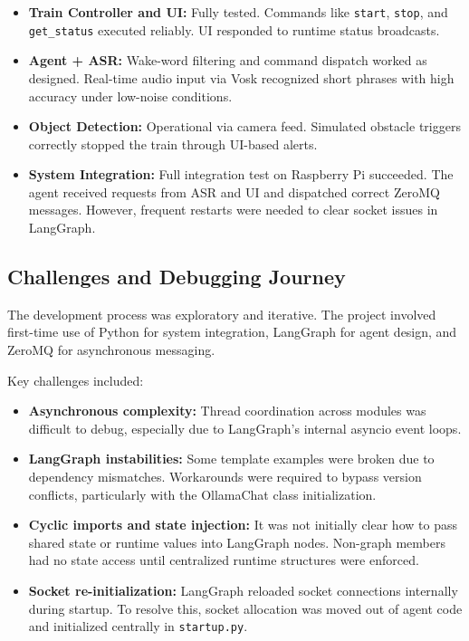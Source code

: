 \begin{itemize}
  \item \textbf{Train Controller and UI:} Fully tested. Commands like \texttt{start}, \texttt{stop}, and \texttt{get\_status} executed reliably. UI responded to runtime status broadcasts.
  \item \textbf{Agent + ASR:} Wake-word filtering and command dispatch worked as designed. Real-time audio input via Vosk recognized short phrases with high accuracy under low-noise conditions.
  \item \textbf{Object Detection:} Operational via camera feed. Simulated obstacle triggers correctly stopped the train through UI-based alerts.
  \item \textbf{System Integration:} Full integration test on Raspberry Pi succeeded. The agent received requests from ASR and UI and dispatched correct ZeroMQ messages. However, frequent restarts were needed to clear socket issues in LangGraph.
\end{itemize}

\subsection{Challenges and Debugging Journey}

The development process was exploratory and iterative. The project involved first-time use of Python for system integration, LangGraph for agent design, and ZeroMQ for asynchronous messaging.

Key challenges included:

\begin{itemize}
  \item \textbf{Asynchronous complexity:} Thread coordination across modules was difficult to debug, especially due to LangGraph’s internal asyncio event loops.
  \item \textbf{LangGraph instabilities:} Some template examples were broken due to dependency mismatches. Workarounds were required to bypass version conflicts, particularly with the OllamaChat class initialization.
  \item \textbf{Cyclic imports and state injection:} It was not initially clear how to pass shared state or runtime values into LangGraph nodes. Non-graph members had no state access until centralized runtime structures were enforced.
  \item \textbf{Socket re-initialization:} LangGraph reloaded socket connections internally during startup. To resolve this, socket allocation was moved out of agent code and initialized centrally in \texttt{startup.py}.
\end{itemize}

